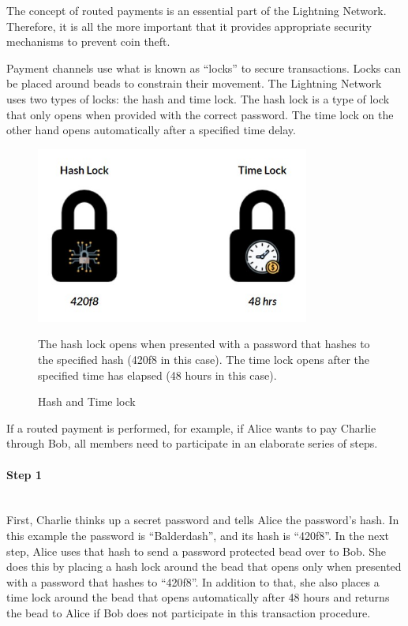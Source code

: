 \documentclass[a4paper, 12pt]{report}
\begin{document}
\par The concept of routed payments is an essential part of the Lightning Network. Therefore, it is all the more important that it provides appropriate security mechanisms to prevent coin theft.

\par Payment channels use what is known as “locks” to secure transactions. Locks can be placed around beads to constrain their movement. The Lightning Network uses two types of locks: the hash and time lock. The hash lock is a type of lock that only opens when provided with the correct password. The time lock on the other hand opens automatically after a specified time delay.

\begin{figure}[H]
	\centering
	\includegraphics[width=9cm]{10_Locks}
	\caption{Hash and Time lock}
	\medskip
	\small The hash lock opens when presented with a password that hashes to the specified hash (420f8 in this case). The time lock opens after the specified time has elapsed (48 hours in this case).
	\label{fig:10_Locks}
\end{figure}

\par If a routed payment is performed, for example, if Alice wants to pay Charlie through Bob, all members need to participate in an elaborate series of steps.

\paragraph{Step 1} \hspace{0pt} \\
First, Charlie thinks up a secret password and tells Alice the password’s hash. In this example the password is “Balderdash”, and its hash is “420f8”. In the next step, Alice uses that hash to send a password protected bead over to Bob. She does this by placing a hash lock around the bead that opens only when presented with a password that hashes to “420f8”. In addition to that, she also places a time lock around the bead that opens automatically after 48 hours and returns the bead to Alice if Bob does not participate in this transaction procedure.
\end{document}
